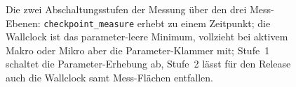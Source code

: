 \begin{nurlang}
\begin{figure}[htbp]
\caption[Die zwei Abschaltungsstufen der Messung]{Die zwei Abschaltungsstufen der Messung über den drei Mess-Ebenen: \texttt{checkpoint\_measure}
erhebt zu einem Zeitpunkt; die Wallclock ist das parameter-leere Minimum, vollzieht bei aktivem Makro oder
Mikro aber die Parameter-Klammer mit; Stufe~1 schaltet die Parameter-Erhebung ab, Stufe~2 lässt für den
Release auch die Wallclock samt Mess-Flächen entfallen.}\label{fig:abschaltungsstufen}
\end{figure}
\end{nurlang}
